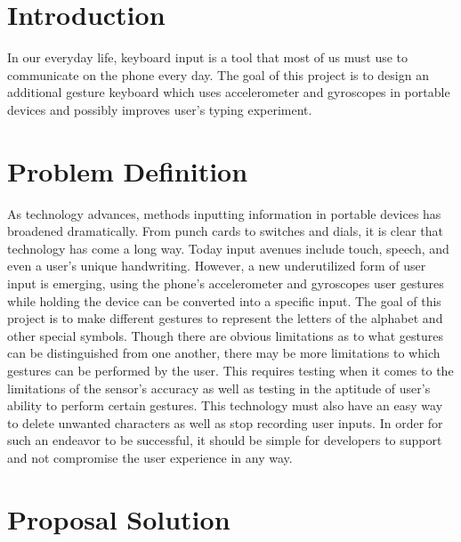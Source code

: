 \documentclass[onecolumn, draftclsnofoot,10pt, compsoc]{IEEEtran}
\begin{document}
\clearpage

\section{Introduction}

In our everyday life, keyboard input is a tool that most of us must use to communicate on the phone every day. The goal of this project is to design an additional gesture keyboard which uses accelerometer and gyroscopes in portable devices and possibly improves user's typing experiment.

\section{Problem Definition}

As technology advances, methods inputting information in portable devices has broadened dramatically. From punch cards to switches and dials, it is clear that technology has come a long way. Today input avenues include touch, speech, and even a user’s unique handwriting. However, a new underutilized form of user input is emerging, using the phone’s accelerometer and gyroscopes user gestures while holding the device can be converted into a specific input. The goal of this project is to make different gestures to represent the letters of the alphabet and other special symbols. Though there are obvious limitations as to what gestures can be distinguished from one another, there may be more limitations to which gestures can be performed by the user. This requires testing when it comes to the limitations of the sensor’s accuracy as well as testing in the aptitude of user’s ability to perform certain gestures. This technology must also have an easy way to delete unwanted characters as well as stop recording user inputs. In order for such an endeavor to be successful, it should be simple for developers to support and not compromise the user experience in any way.

\section{Proposal Solution}
\end{document}
